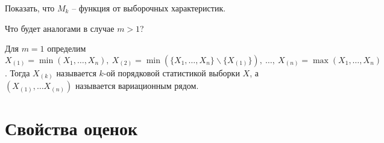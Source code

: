 \begin{exercise}
Показать, что $\displaystyle M_{k}$ -- функция от выборочных характеристик.
\end{exercise}
\begin{exercise}
Что будет аналогами в случае $\displaystyle m >1$?
\end{exercise}
\begin{definition}
Для $\displaystyle m=1$ определим $\displaystyle X_{( 1)} =\min( X_{1} ,\dotsc ,X_{n}),\ X_{( 2)} =\min(\{X_{1},\dotsc, X_{n}\} \backslash \{X_{( 1)}\}),\ \dotsc,\ X_{( n)} =\max( X_{1}, \dotsc ,X_{n})$. Тогда $\displaystyle X_{( k)}$ называется $\displaystyle k$-ой порядковой статистикой выборки $\displaystyle X$, а $\displaystyle ( X_{( 1)} ,\dotsc X_{( n)})$ называется вариационным рядом.
\end{definition}
\section{Свойства оценок}

